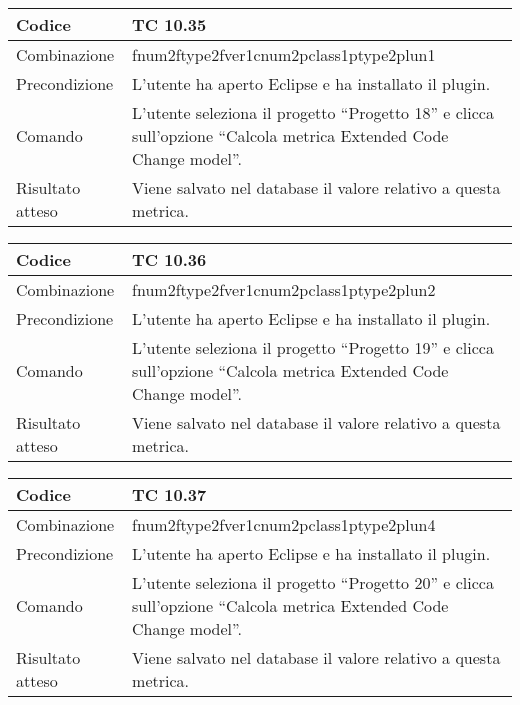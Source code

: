 \begin{table}[ht]
\begin{tabular}{|p{3cm}|p{9cm}|}
\hline
\cellcolor{lightgray}Codice				& TC 10.35								\\
\hline
\cellcolor{lightgray}Combinazione		& fnum2ftype2fver1cnum2pclass1ptype2plun1									\\
\hline
\cellcolor{lightgray}Precondizione		& L'utente ha aperto Eclipse e ha installato il plugin.		\\
\hline
\cellcolor{lightgray}Comando			& L'utente seleziona il progetto ``Progetto 18''  e clicca sull'opzione ``Calcola metrica Extended Code Change model''.	\\
\hline
\cellcolor{lightgray}Risultato atteso	& Viene salvato nel database il valore relativo a questa metrica.\\
\hline
\end{tabular}
\end{table}

\begin{table}[ht]
\begin{tabular}{|p{3cm}|p{9cm}|}
\hline
\cellcolor{lightgray}Codice				& TC 10.36								\\
\hline
\cellcolor{lightgray}Combinazione		& fnum2ftype2fver1cnum2pclass1ptype2plun2									\\
\hline
\cellcolor{lightgray}Precondizione		& L'utente ha aperto Eclipse e ha installato il plugin.		\\
\hline
\cellcolor{lightgray}Comando			& L'utente seleziona il progetto ``Progetto 19''  e clicca sull'opzione ``Calcola metrica Extended Code Change model''.	\\
\hline
\cellcolor{lightgray}Risultato atteso	& Viene salvato nel database il valore relativo a questa metrica.\\
\hline
\end{tabular}
\end{table}

\begin{table}[ht]
\begin{tabular}{|p{3cm}|p{9cm}|}
\hline
\cellcolor{lightgray}Codice				& TC 10.37								\\
\hline
\cellcolor{lightgray}Combinazione		& fnum2ftype2fver1cnum2pclass1ptype2plun4									\\
\hline
\cellcolor{lightgray}Precondizione		& L'utente ha aperto Eclipse e ha installato il plugin.		\\
\hline
\cellcolor{lightgray}Comando			& L'utente seleziona il progetto ``Progetto 20''  e clicca sull'opzione ``Calcola metrica Extended Code Change model''.	\\
\hline
\cellcolor{lightgray}Risultato atteso	& Viene salvato nel database il valore relativo a questa metrica.\\
\hline
\end{tabular}
\end{table}

